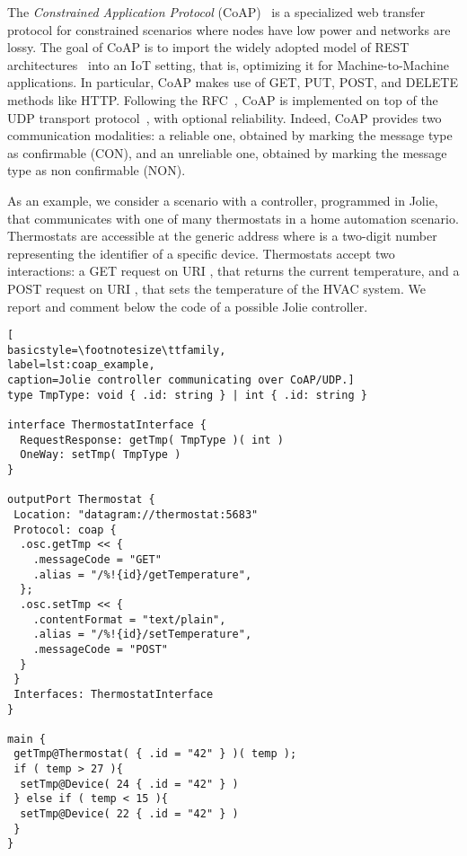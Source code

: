 The \textit{Constrained Application Protocol}
(CoAP)~\cite{coap,doi:10.17487/RFC7252} is a specialized web transfer protocol
for constrained scenarios where nodes have low power and networks are lossy. The
goal of CoAP is to import the widely adopted model of REST
architectures~\cite{fielding00} into an IoT setting, that is, optimizing it for
Machine-to-Machine applications. In particular, CoAP makes use of GET, PUT,
POST, and DELETE methods like HTTP.
%
Following the RFC~\cite{doi:10.17487/RFC7252}, CoAP is implemented on top of the
UDP transport protocol~\cite{UDP}, with optional reliability. Indeed, CoAP
provides two communication modalities: a reliable one, obtained by marking the
message type as confirmable (CON), and an unreliable one, obtained by marking the
message type as non confirmable (NON).

As an example, we consider a scenario with a controller, programmed in Jolie,
that communicates with one of many thermostats in a home automation scenario.
Thermostats are accessible at the generic address
 where  is a two-digit number
representing the identifier of a specific device. Thermostats accept two
interactions: a GET request on URI ,
that returns the current temperature, and a POST
request on URI , that sets the
temperature of the HVAC system.
%
We report and comment below the code of a possible Jolie controller.

\begin{lstlisting}[
basicstyle=\footnotesize\ttfamily,
label=lst:coap_example,
caption=Jolie controller communicating over CoAP/UDP.]
type TmpType: void { .id: string } | int { .id: string }

interface ThermostatInterface {
  RequestResponse: getTmp( TmpType )( int )
  OneWay: setTmp( TmpType )
}

outputPort Thermostat {
 Location: "datagram://thermostat:5683"
 Protocol: coap {
  .osc.getTmp << {
    .messageCode = "GET"
    .alias = "/%!{id}/getTemperature",
  };
  .osc.setTmp << {
    .contentFormat = "text/plain",
    .alias = "/%!{id}/setTemperature",
    .messageCode = "POST"
  }
 }
 Interfaces: ThermostatInterface
}

main {
 getTmp@Thermostat( { .id = "42" } )( temp );
 if ( temp > 27 ){
  setTmp@Device( 24 { .id = "42" } )
 } else if ( temp < 15 ){
  setTmp@Device( 22 { .id = "42" } )
 }
}
\end{lstlisting}

